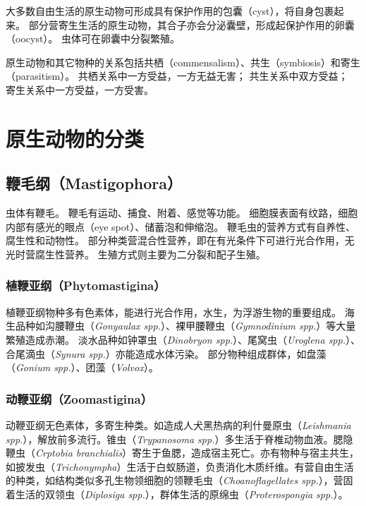 \documentclass[11pt]{article}
\begin{document}
\newline

大多数自由生活的原生动物可形成具有保护作用的包囊（cyst），将自身包裹起来。
部分营寄生生活的原生动物，其合子亦会分泌囊壁，形成起保护作用的卵囊（oocyst）。
虫体可在卵囊中分裂繁殖。

\newline

原生动物和其它物种的关系包括共栖（commensalism）、共生（symbiosis）和寄生（parasitism）。
共栖关系中一方受益，一方无益无害；
共生关系中双方受益；
寄生关系中一方受益，一方受害。

\section{原生动物的分类}
\subsection{鞭毛纲（Mastigophora）}
虫体有鞭毛。
鞭毛有运动、捕食、附着、感觉等功能。
细胞膜表面有纹路，细胞内部有感光的眼点（eye spot）、储蓄泡和伸缩泡。
鞭毛虫的营养方式有自养性、腐生性和动物性。
部分种类营混合性营养，即在有光条件下可进行光合作用，无光时营腐生性营养。
生殖方式则主要为二分裂和配子生殖。

\subsubsection{植鞭亚纲（Phytomastigina）}
植鞭亚纲物种多有色素体，能进行光合作用，水生，为浮游生物的重要组成。
海生品种如沟腰鞭虫（\textit{Gonyaulax spp.}）、裸甲腰鞭虫（\textit{Gymnodinium spp.}）等大量繁殖造成赤潮。
淡水品种如钟罩虫（\textit{Dinobryon spp.}）、尾窝虫（\textit{Uroglena spp.}）、合尾滴虫（\textit{Synura spp.}）亦能造成水体污染。
部分物种组成群体，如盘藻（\textit{Gonium spp.}）、团藻（\textit{Volvox}）。

\subsubsection{动鞭亚纲（Zoomastigina）}
动鞭亚纲无色素体，多寄生种类。如造成人犬黑热病的利什曼原虫（\textit{Leishmania spp.}），解放前多流行。锥虫（\textit{Trypanosoma spp.}）多生活于脊椎动物血液。腮隐鞭虫（\textit{Crptobia branchialis}）寄生于鱼腮，造成宿主死亡。亦有物种与宿主共生，如披发虫（\textit{Trichonympha}）生活于白蚁肠道，负责消化木质纤维。有营自由生活的种类，如结构类似多孔生物领细胞的领鞭毛虫（\textit{Choanoflagellates spp.}），营固着生活的双领虫（\textit{Diplosiga spp.}），群体生活的原绵虫（\textit{Proterospongia spp.}）。
\end{document}
